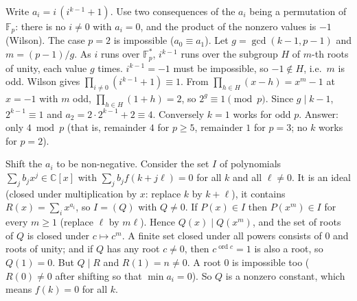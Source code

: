 \documentclass[11pt,a4paper]{article}
\begin{document}
 Write $a_i=i\,(i^{k-1}+1)$. Use two consequences of the $a_i$ being a permutation of $\mathbb{F}_p$: there is no $i\ne0$ with $a_i=0$, and the product of the nonzero values is $-1$ (Wilson). The case $p=2$ is impossible ($a_0\equiv a_1$).
 Let $g=\gcd(k-1,p-1)$ and $m=(p-1)/g$. As $i$ runs over $\mathbb{F}_p^*$, $i^{k-1}$ runs over the subgroup $H$ of $m$-th roots of unity, each value $g$ times. $i^{k-1}=-1$ must be impossible, so $-1\notin H$, i.e.\ $m$ is odd.
 Wilson gives $\prod_{i\ne0}(i^{k-1}+1)\equiv1$. From $\prod_{h\in H}(x-h)=x^m-1$ at $x=-1$ with $m$ odd, $\prod_{h\in H}(1+h)=2$, so $2^g\equiv1\pmod p$. Since $g\mid k-1$, $2^{k-1}\equiv1$ and $a_2=2\cdot2^{k-1}+2\equiv4$. Conversely $k=1$ works for odd $p$. Answer: only $4\bmod p$ (that is, remainder $4$ for $p\ge5$, remainder $1$ for $p=3$; no $k$ works for $p=2$).

 Shift the $a_i$ to be non-negative. Consider the set $I$ of polynomials $\sum_jb_jx^j\in\mathbb{C}[x]$ with $\sum_jb_jf(k+j\ell)=0$ for all $k$ and all $\ell\ne0$. It is an ideal (closed under multiplication by $x$: replace $k$ by $k+\ell$), it contains $R(x)=\sum_ix^{a_i}$, so $I=(Q)$ with $Q\ne0$.
 If $P(x)\in I$ then $P(x^m)\in I$ for every $m\ge1$ (replace $\ell$ by $m\ell$). Hence $Q(x)\mid Q(x^m)$, and the set of roots of $Q$ is closed under $c\mapsto c^m$.
 A finite set closed under all powers consists of $0$ and roots of unity; and if $Q$ has any root $c\ne0$, then $c^{\operatorname{ord}c}=1$ is also a root, so $Q(1)=0$. But $Q\mid R$ and $R(1)=n\ne0$. A root $0$ is impossible too ($R(0)\neq0$ after shifting so that $\min a_i=0$). So $Q$ is a nonzero constant, which means $f(k)=0$ for all $k$.
\end{document}
